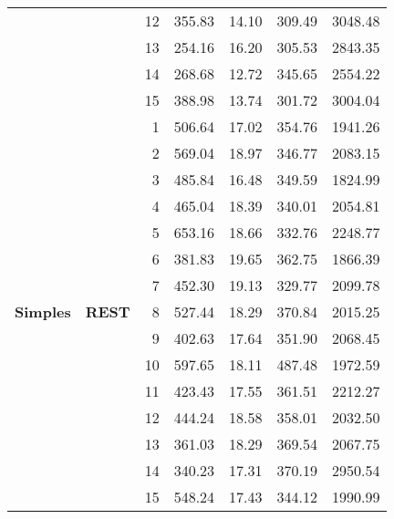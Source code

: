 \begin{longtable}{@{} llrrrrr @{}}
        & & 12 & 355.83 & 14.10 & 309.49 & 3048.48 \\
        & & 13 & 254.16 & 16.20 & 305.53 & 2843.35 \\
        & & 14 & 268.68 & 12.72 & 345.65 & 2554.22 \\
        & & 15 & 388.98 & 13.74 & 301.72 & 3004.04 \\
    \cline{2-7}
    \multirow{15}{*}{\textbf{Simples}} & \multirow{15}{*}{\textbf{REST}} 
        & 1 & 506.64 & 17.02 & 354.76 & 1941.26 \\
        & & 2 & 569.04 & 18.97 & 346.77 & 2083.15 \\
        & & 3 & 485.84 & 16.48 & 349.59 & 1824.99 \\
        & & 4 & 465.04 & 18.39 & 340.01 & 2054.81 \\
        & & 5 & 653.16 & 18.66 & 332.76 & 2248.77 \\
        & & 6 & 381.83 & 19.65 & 362.75 & 1866.39 \\
        & & 7 & 452.30 & 19.13 & 329.77 & 2099.78 \\
        & & 8 & 527.44 & 18.29 & 370.84 & 2015.25 \\
        & & 9 & 402.63 & 17.64 & 351.90 & 2068.45 \\
        & & 10 & 597.65 & 18.11 & 487.48 & 1972.59 \\
        & & 11 & 423.43 & 17.55 & 361.51 & 2212.27 \\
        & & 12 & 444.24 & 18.58 & 358.01 & 2032.50 \\
        & & 13 & 361.03 & 18.29 & 369.54 & 2067.75 \\
        & & 14 & 340.23 & 17.31 & 370.19 & 2950.54 \\
        & & 15 & 548.24 & 17.43 & 344.12 & 1990.99 \\
    \hline
    

\end{longtable}
